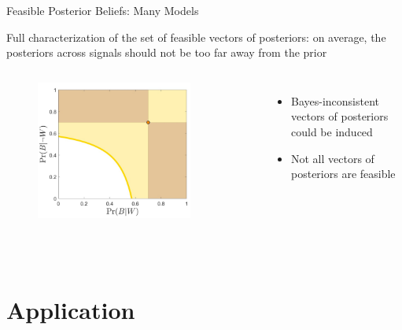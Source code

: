 \documentclass[aspectratio=169]{beamer}
\theoremstyle{definition}
\theoremstyle{plain}
\theoremstyle{plain}
\theoremstyle{definition}
\theoremstyle{plain}
\theoremstyle{plain}
\theoremstyle{plain}
\theoremstyle{plain}
\theoremstyle{remark}
\theoremstyle{definition}
\begin{document}
\begin{frame}[label=PB5]{Feasible Posterior Beliefs: Many Models}

Full characterization of the set of feasible vectors of posteriors: on average, the posteriors across signals should not be too far away from the prior

\begin{columns}[c] 	
	\begin{figure}
		\includegraphics[height=0.8\textwidth]{Figs/Fig_05.PNG}
	\end{figure}
		
	\begin{itemize}
            \item Bayes-inconsistent vectors of posteriors could be induced
            \item Not all vectors of posteriors are feasible
        \end{itemize}
\end{columns}

\end{frame}

\section{Application}
\end{document}
